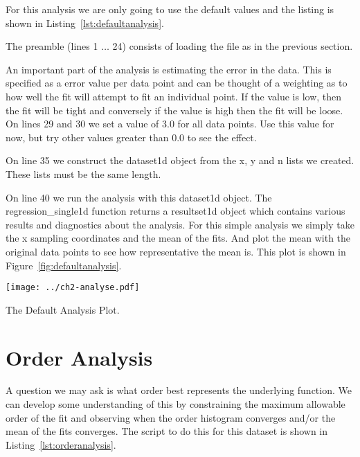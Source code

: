 \documentclass{tufte-handout}
\begin{document}
For this analysis we are only going to use the default values and the listing is shown in 
Listing~\ref{lst:defaultanalysis}. 

\lstset{caption=Running the Default Analysis.,label=lst:defaultanalysis}


The preamble (lines 1 $\ldots$ 24) consists of loading the file as in the previous
section. 

An important part of the analysis is estimating the error in the data.
This is specified as a error value per data point and can be thought of a weighting
as to how well the fit will attempt to fit an individual point. If the value
is low, then the fit will be tight and conversely if the value is high then the 
fit will be loose. On lines 29 and 30 we set a value of 3.0 for all data points.
Use this value for now, but try other values greater than 0.0 to see the effect.

On line 35 we construct the dataset1d object from the x, y and n lists we created.
These lists must be the same length.

On line 40 we run the analysis with this dataset1d object. The regression\_single1d
function returns a resultset1d object which contains various results and diagnostics
about the analysis. For this simple analysis we simply take the x sampling coordinates
and the mean of the fits. And plot the mean with the original data points to see 
how representative the mean is. This plot is shown in Figure~\ref{fig:defaultanalysis}.

\begin{marginfigure}
\texttt{[image: ../ch2-analyse.pdf]}
\caption{The Default Analysis Plot.}
\label{fig:defaultanalysis}
\end{marginfigure}

\section{Order Analysis}

A question we may ask is what order best represents the underlying
function. We can develop some understanding of this by constraining
the maximum allowable order of the fit and observing when the order
histogram converges and/or the mean of the fits converges. The script
to do this for this dataset is shown in
Listing~\ref{lst:orderanalysis}.

\lstset{caption=Order Analysis.,label=lst:orderanalysis}

\end{document}
